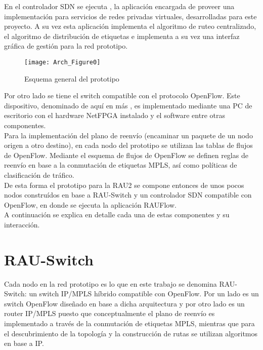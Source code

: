 En el controlador SDN se ejecuta , la aplicaci\'on encargada de proveer una implementaci\'on para servicios de redes privadas virtuales, desarrolladas para este proyecto. A su vez esta aplicaci\'on implementa el algoritmo de ruteo  centralizado, el algoritmo de distribución de etiquetas e implementa a su vez una interfaz gr\'afica de gesti\'on para la red prototipo.\\

\begin{figure}[h] 
\centering    
\texttt{[image: Arch\_Figure0]}
\caption[Esquema general del prototipo]{Esquema general del prototipo}
\label{fig:OpenSourceRArch0}
\end{figure}

Por otro lado se tiene el switch compatible con el protocolo OpenFlow. Este dispositivo, denominado de aqu\'i en m\'as , es implementado mediante una PC de escritorio con el hardware NetFPGA instalado y el software  entre otras componentes.\\ 

Para la implementaci\'on del plano de reenvío (encaminar un paquete de un nodo origen a otro destino), en cada nodo del prototipo se utilizan las tablas de flujos de OpenFlow. Mediante el esquema de flujos de OpenFlow se definen reglas de reenv\'io en base a la conmutaci\'on de etiquetas MPLS, as\'i como pol\'iticas de clasificaci\'on de tr\'afico.\\

De esta forma el prototipo para la RAU2 se compone entonces de unos pocos nodos constru\'idos en base a RAU-Switch y un controlador SDN compatible con OpenFlow, en donde se ejecuta la aplicaci\'on RAUFlow.\\

A continuaci\'on se explica en detalle cada una de estas componentes y su interacci\'on.

\section{RAU-Switch}
Cada nodo en la red prototipo es lo que en este trabajo se denomina RAU-Switch: un switch IP/MPLS h\'ibrido compatible con OpenFlow. Por un lado es un switch OpenFlow dise\~nado en base a dicha arquitectura y por otro lado es un router IP/MPLS puesto que conceptualmente el plano de reenvío es implementado a trav\'es de la conmutación de etiquetas MPLS, mientras que para el descubrimiento de la topolog\'ia y la construcci\'on de rutas se utilizan algoritmos en base a IP.\\

